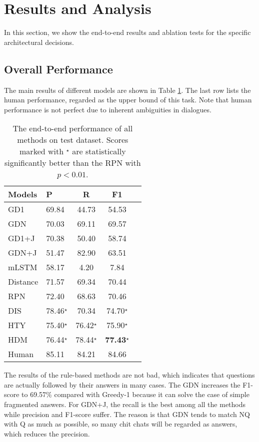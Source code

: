 \section{Results and Analysis}
\label{sec:results}
 
In this section, we show the end-to-end results and ablation tests for the specific architectural decisions.
\subsection{Overall Performance}
The main results of different models are shown in Table \ref{tab:mainResults}. The last row lists the human performance, regarded as the upper bound of this task. Note that
human performance is not perfect due to inherent ambiguities in dialogues. 


\begin{table}

	\centering
	\begin{tabular}{p{1cm}<{\centering}p{1cm}<{\centering}ccc}
		\toprule[1.5pt]
		Models &P&R& F1\\
		\midrule[1pt]
		GD1&69.84&44.73&54.53\\
		GDN  &70.03&69.11&69.57\\
		GD1+J&70.38&50.40&58.74\\
		GDN+J&51.47&82.90&63.51\\
		\hline
		mLSTM&58.17&4.20&7.84\\
		Distance&71.57&69.34&70.44\\
		RPN&72.40&68.63&70.46\\
\hline
		DIS&78.46$^\star$&70.34&74.70$^\star$\\
		HTY&75.40$^\star$&76.42$^\star$&75.90$^\star$\\
		HDM&76.44$^\star$&78.44$^\star$&\textbf{77.43}$^\star$\\
		\hline
		Human &85.11&84.21&84.66\\
		\bottomrule[1.5pt]
	\end{tabular}
	\vspace{-0.25cm}
	\caption{The end-to-end performance of all methods on test dataset. 
Scores marked with $^\star$ are statistically significantly better than the RPN 
with $p<0.01$.} 
	\label{tab:mainResults}
\end{table}

 

The results of the rule-based methods are not bad, which indicates that questions 
are actually followed by their answers in many cases. The GDN increases the F1-score 
to 69.57\% compared with Greedy-1 because it can solve the case of simple fragmented 
answers. For GDN+J, the recall is the best among all the methods while precision and 
F1-score suffer. 
The reason is that GDN tends to match NQ with Q as much as possible, so many chit chats will be regarded as answers, which reduces the precision.

